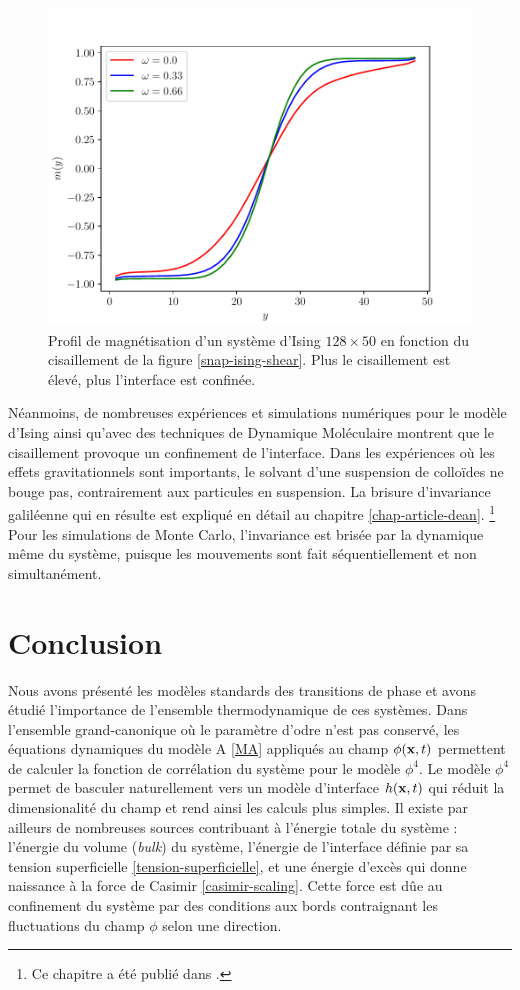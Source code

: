 \begin{figure}
    \centering
    \includegraphics[width=0.6\linewidth]{intro/profil-mag-ising-shear.pdf}
    \caption{Profil de magnétisation d'un système d'Ising $128 \times 50$ en fonction du cisaillement de la figure \ref{snap-ising-shear}. Plus le cisaillement est élevé, plus l'interface est confinée.}
    \label{profil-mag-ising-shear}
\end{figure}

Néanmoins, de nombreuses expériences\cite{derks_suppression_2006} et simulations numériques pour le modèle d'Ising \cite{leung_field_1986,rikvold_microstructure_2002,gonnella_nonequilibrium_2009,smith_driven_2010,smith_interfaces_2008,sadhu_non-local_2014,cohen_interface_2016,cirillo_monte_2005} ainsi qu'avec des techniques de Dynamique Moléculaire \cite{berthier_nonequilibrium_2002} montrent que le cisaillement provoque un confinement de l'interface. Dans les expériences où les effets gravitationnels sont importants, le solvant d'une suspension de colloïdes ne bouge pas, contrairement aux particules en suspension. La brisure d'invariance galiléenne qui en résulte est expliqué en détail au chapitre \ref{chap-article-dean}. \footnote{Ce chapitre a été publié dans \cite{dean_effect_2020}.}
Pour les simulations de Monte Carlo, l'invariance est brisée par la dynamique même du système, puisque les mouvements sont fait séquentiellement et non simultanément.

\section{Conclusion}

Nous avons présenté les modèles standards des transitions de phase et avons étudié l'importance de l'ensemble thermodynamique de ces systèmes.
Dans l'ensemble grand-canonique où le paramètre d'odre n'est pas conservé, les équations dynamiques du modèle A \ref{MA} appliqués au champ $\phi({\bf x},t)$ permettent de calculer la fonction de corrélation du système pour le modèle $\phi^4$. Le modèle $\phi^4$ permet de basculer naturellement vers un modèle d'interface $h({\bf x},t)$ qui réduit la dimensionalité du champ et rend ainsi les calculs plus simples.
	Il existe par ailleurs de nombreuses sources contribuant à l'énergie totale du système : l'énergie du volume (\textit{bulk}) du système, l'énergie de l'interface définie par sa tension superficielle \ref{tension-superficielle}, et une énergie d'excès qui donne naissance à la force de Casimir \ref{casimir-scaling}. Cette force est dûe au confinement du système par des conditions aux bords contraignant les fluctuations du champ $\phi$ selon une direction. 


